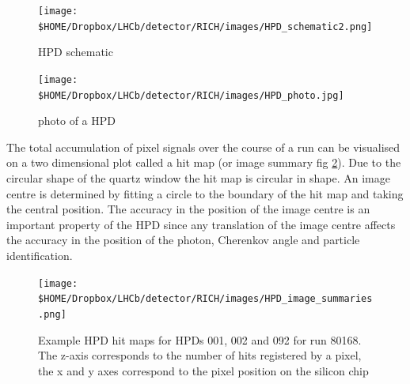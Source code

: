 \begin{figure}
	\begin{minipage}[b]{0.45\linewidth}
		\centering
			\texttt{[image: \$HOME/Dropbox/LHCb/detector/RICH/images/HPD\_schematic2.png]}
			\caption{HPD schematic}
			\label{fig: HPD schematic}
	\end{minipage}
	\hspace{0.5cm}
	\begin{minipage}[b]{0.45\linewidth}
		\centering
		\texttt{[image: \$HOME/Dropbox/LHCb/detector/RICH/images/HPD\_photo.jpg]}
		\caption{photo of a HPD}
		\label{fig:HPD_photo}
	\end{minipage}
\end{figure}

The total accumulation of pixel signals over the course of a run can be visualised on a two dimensional plot called a hit map (or image summary fig \ref{example_HPD_image_summaries}). Due to the circular shape of the quartz window the hit map is circular in shape. An image centre is determined by fitting a circle to the boundary of the hit map and taking the central position. The accuracy in the position of the image centre is an important property of the HPD since any translation of the image centre affects the accuracy in the position of the photon, Cherenkov angle and particle identification. 

\begin{figure}
	\begin{center}
		\texttt{[image: \$HOME/Dropbox/LHCb/detector/RICH/images/HPD\_image\_summaries.png]}
		\caption{Example HPD hit maps for HPDs 001, 002 and 092 for run 80168. The z-axis corresponds to the number of hits registered by a pixel, the x and y axes correspond to the pixel position on the silicon chip}
		\label{example_HPD_image_summaries}
	\end{center}
\end{figure}

